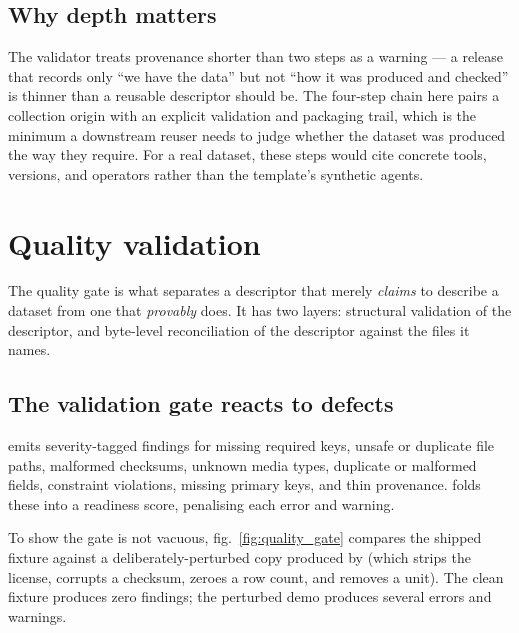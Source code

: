 \documentclass[
]{article}
\begin{document}
\subsection{Why depth matters}\label{why-depth-matters}

The validator treats provenance shorter than two steps as a warning ---
a release that records only ``we have the data'' but not ``how it was
produced and checked'' is thinner than a reusable descriptor should be.
The four-step chain here pairs a collection origin with an explicit
validation and packaging trail, which is the minimum a downstream reuser
needs to judge whether the dataset was produced the way they require.
For a real dataset, these steps would cite concrete tools, versions, and
operators rather than the template's synthetic agents.

\newpage

\section{Quality validation}\label{sec:quality}

The quality gate is what separates a descriptor that merely
\emph{claims} to describe a dataset from one that \emph{provably} does.
It has two layers: structural validation of the descriptor, and
byte-level reconciliation of the descriptor against the files it names.

\subsection{The validation gate reacts to
defects}\label{the-validation-gate-reacts-to-defects}

 emits severity-tagged findings for
missing required keys, unsafe or duplicate file paths, malformed
checksums, unknown media types, duplicate or malformed fields,
constraint violations, missing primary keys, and thin provenance.
 folds these into a readiness score,
penalising each error and warning.

To show the gate is not vacuous, fig.~\ref{fig:quality_gate} compares
the shipped fixture against a deliberately-perturbed copy produced by
 (which strips the license, corrupts
a checksum, zeroes a row count, and removes a unit). The clean fixture
produces zero findings; the perturbed demo produces several errors and
warnings.
\end{document}
